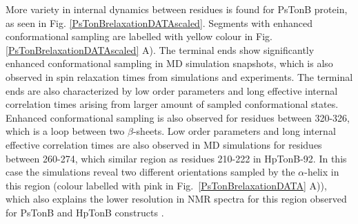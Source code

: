 \documentclass[pre,aps,floatfix,authordate1-4,twocolumn]{revtex4-1}
\begin{document}
More variety in internal dynamics between residues is found for PsTonB protein,
as seen in Fig. \ref{PsTonBrelaxationDATAscaled}. Segments
with enhanced conformational sampling are labelled with yellow colour
in Fig. \ref{PsTonBrelaxationDATAscaled} A).
The terminal ends show significantly enhanced conformational sampling
in MD simulation snapshots, which is also observed in spin relaxation times
from simulations and experiments. The terminal ends are also characterized
by low order parameters and long effective internal correlation times
arising from larger amount of sampled conformational states.
Enhanced conformational sampling is also observed for residues between 320-326,
which is a loop between two $\beta$-sheets.
Low order parameters and long internal effective correlation times are also
observed in MD simulations for residues between 260-274, which similar region
as residues 210-222 in HpTonB-92. In this case the simulations reveal
two different orientations sampled by the $\alpha$-helix in this region
(colour labelled with pink in Fig.~\ref{PsTonBrelaxationDATA} A)), which
also explains the lower resolution in NMR spectra for this region
observed for PsTonB and HpTonB constructs \cite{??}.
\end{document}
